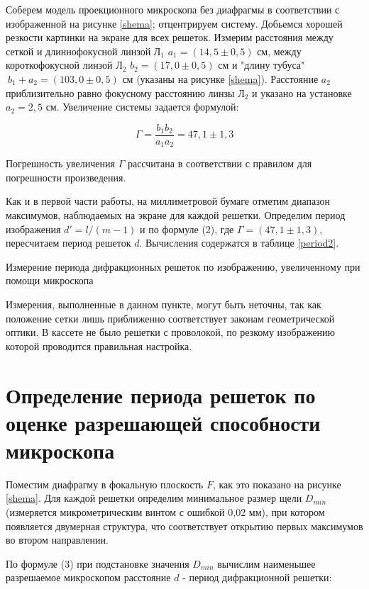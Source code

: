 \documentclass[12pt]{kiarticle}
\begin{document}
	Соберем модель проекционного микроскопа без диафрагмы в соответствии с изображенной на рисунке \ref{shema}; отцентрируем систему. Добьемся хорошей резкости картинки на экране для всех решеток. Измерим расстояния между сеткой и длиннофокусной линзой $\text{Л}_1$ $a_1 = (14,5 \pm 0,5)$ см, между короткофокусной линзой $\text{Л}_2$ $b_2 = (17,0 \pm 0,5)$ см и "длину тубуса" $\ b_1 + a_2 = (103,0 \pm 0,5)$ см (указаны на рисунке \ref{shema}). Расстояние $a_2$ приблизительно равно фокусному расстоянию линзы $\text{Л}_2$ и указано на установке $a_2 = 2,5$ см. Увеличение системы задается формулой: 
	
	\[ \Gamma = \frac{b_1b_2}{a_1a_2} = 47,1 \pm 1,3 \]
	
	Погрешность увеличения $\Gamma$ рассчитана в соответствии с правилом для погрешности произведения. 
	
	Как и в первой части работы, на миллиметровой бумаге отметим диапазон максимумов, наблюдаемых на экране для каждой решетки. Определим период изображения $d' = l/(m-1)$ и по формуле (2), где $\Gamma = (47,1 \pm 1,3)$, пересчитаем период решеток $d$. Вычисления содержатся в таблице \ref{period2}.
	
	\begin{table}[h]
		\centering
		
		\caption{Измерение периода дифракционных решеток по изображению, увеличенному при помощи микроскопа}
		\label{period2}
	\end{table}	
	
	Измерения, выполненные в данном пункте, могут быть неточны, так как положение сетки лишь приближенно соответствует законам геометрической оптики. В кассете не было решетки с проволокой, по резкому изображению которой проводится правильная настройка. 
	
	\clearpage
	
	\section{Определение периода решеток по оценке разрешающей способности микроскопа}
	
	Поместим диафрагму в фокальную плоскость $F$, как это показано на рисунке \ref{shema}. Для каждой решетки определим минимальное размер щели $D_{min}$ (измеряется микрометрическим винтом с ошибкой 0,02 мм), при котором появляется двумерная структура, что соответствует открытию первых максимумов во втором направлении. 
	
	По формуле (3) при подстановке значения $D_{min}$ вычислим наименьшее разрешаемое микроскопом расстояние $d$ - период дифракционной решетки: 
	
\end{document}
